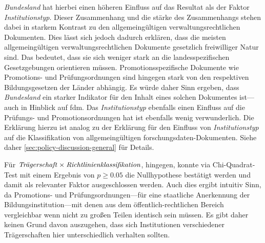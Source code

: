 \textit{Bundesland} hat hierbei einen höheren Einfluss auf das Resultat als der Faktor \textit{Institutionstyp}.
Dieser Zusammenhang und die stärke des Zusammenhangs stehen dabei in starkem Kontrast zu den allgemeingültigen verwaltungsrechtlichen Dokumenten.
Dies lässt sich jedoch dadurch erklären, dass die meisten allgemeingültigen verwaltungsrechtlichen Dokumente gesetzlich freiwilliger Natur sind.
Das bedeutet, dass sie sich weniger stark an die landesspezifischen Gesetzgebungen orientieren müssen.
Promotionsspezifische Dokumente wie Promotions- und Prüfungsordnungen sind hingegen stark von den respektiven Bildungsgesetzen der Länder abhängig.
Es würde daher Sinn ergeben, dass \textit{Bundesland} ein starker Indikator für den Inhalt eines solchen Dokumentes ist---auch in Hinblick auf \gls{fdm}.
Das \textit{Institutionstyp} ebenfalls einen Einfluss auf die Prüfungs- und Promotionsordnungen hat ist ebenfalls wenig verwunderlich.
Die Erklärung hierzu ist analog zu der Erklärung für den Einfluss von \textit{Institutionstyp} auf die Klassifikation von allgemeingültigen \gls{forschungsdaten}-Dokumenten.
Siehe daher \cref{sec:policy-discussion-general} für Details.

Für $\text{\textit{Trägerschaft}}\times\text{\textit{Richtlinienklassifikation}}$, hingegen, konnte via Chi-Quadrat-Test mit einem Ergebnis von $p\geqslant\num{0,05}$ die Nullhypothese bestätigt werden und damit als relevanter Faktor ausgeschlossen werden.
Auch dies ergibt intuitiv Sinn, da Promotions- und Prüfungsordnungen---für eine staatliche Anerkennung der Bildungsinstitution---mit denen aus dem öffentlich-rechtlichen Bereich vergleichbar wenn nicht zu großen Teilen identisch sein müssen.
Es gibt daher keinen Grund davon auszugehen, dass sich Institutionen verschiedener Trägerschaften hier unterschiedlich verhalten sollten.

